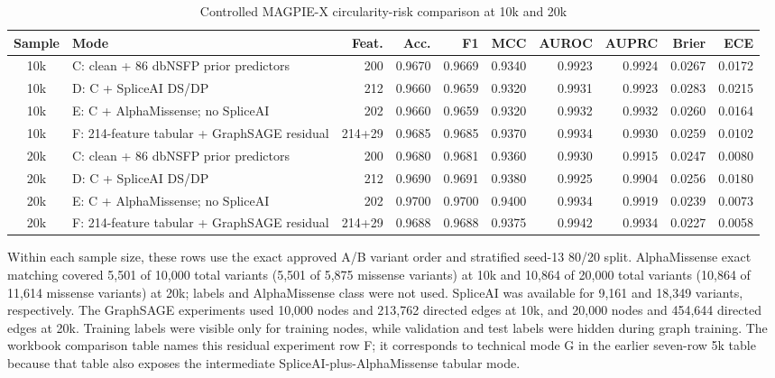 \documentclass[conference]{IEEEtran}
\begin{document}
\begin{table}[t]
\centering
\scriptsize
\caption{Controlled MAGPIE-X circularity-risk comparison at 10k and 20k}
\label{tab:magpie-x-10k-20k}
\begin{tabular}{clrrrrrrrr}
\toprule
Sample & Mode & Feat. & Acc. & F1 & MCC & AUROC & AUPRC & Brier & ECE \\
\midrule
10k & C: clean + 86 dbNSFP prior predictors & 200 & 0.9670 & 0.9669 & 0.9340 & 0.9923 & 0.9924 & 0.0267 & 0.0172 \\
10k & D: C + SpliceAI DS/DP & 212 & 0.9660 & 0.9659 & 0.9320 & 0.9931 & 0.9923 & 0.0283 & 0.0215 \\
10k & E: C + AlphaMissense; no SpliceAI & 202 & 0.9660 & 0.9659 & 0.9320 & 0.9932 & 0.9932 & 0.0260 & 0.0164 \\
10k & F: 214-feature tabular + GraphSAGE residual & 214+29 & 0.9685 & 0.9685 & 0.9370 & 0.9934 & 0.9930 & 0.0259 & 0.0102 \\
20k & C: clean + 86 dbNSFP prior predictors & 200 & 0.9680 & 0.9681 & 0.9360 & 0.9930 & 0.9915 & 0.0247 & 0.0080 \\
20k & D: C + SpliceAI DS/DP & 212 & 0.9690 & 0.9691 & 0.9380 & 0.9925 & 0.9904 & 0.0256 & 0.0180 \\
20k & E: C + AlphaMissense; no SpliceAI & 202 & 0.9700 & 0.9700 & 0.9400 & 0.9934 & 0.9919 & 0.0239 & 0.0073 \\
20k & F: 214-feature tabular + GraphSAGE residual & 214+29 & 0.9688 & 0.9688 & 0.9375 & 0.9942 & 0.9934 & 0.0227 & 0.0058 \\
\bottomrule
\end{tabular}
\end{table}

Within each sample size, these rows use the exact approved A/B variant order and stratified seed-13 80/20 split. AlphaMissense exact matching covered 5,501 of 10,000 total variants (5,501 of 5,875 missense variants) at 10k and 10,864 of 20,000 total variants (10,864 of 11,614 missense variants) at 20k; labels and AlphaMissense class were not used. SpliceAI was available for 9,161 and 18,349 variants, respectively. The GraphSAGE experiments used 10,000 nodes and 213,762 directed edges at 10k, and 20,000 nodes and 454,644 directed edges at 20k. Training labels were visible only for training nodes, while validation and test labels were hidden during graph training. The workbook comparison table names this residual experiment row F; it corresponds to technical mode G in the earlier seven-row 5k table because that table also exposes the intermediate SpliceAI-plus-AlphaMissense tabular mode.
\end{document}
